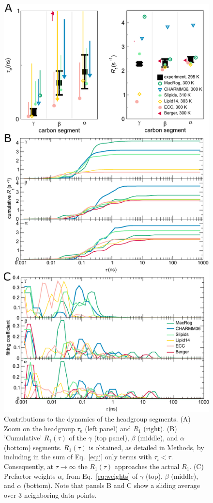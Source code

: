 \documentclass[journal=jcisd8,manuscript=article,layout=twocolumn]{achemso}
\begin{document}
\begin{figure}[!h]
\centering
\includegraphics[width=\columnwidth]{../Figs/cumulativeR1.pdf}
\caption{Contributions to the dynamics of the headgroup segments.
(A) Zoom on the headgroup $\tau_\mathrm e$ (left panel) and $R_1$ (right).
(B) 'Cumulative' $R_1(\tau)$ of the
$\gamma$ (top panel), $\beta$ (middle), and $\alpha$ (bottom) segments.
$R_1(\tau)$ is obtained, as detailed in Methods,
by including in the sum of Eq.~\eqref{eq:j} only terms with $\tau_i<\tau$.
Consequently, at $\tau\to\infty$ the $R_1(\tau)$ approaches the actual $R_1$.
(C) Prefactor weights $\alpha_i$ from Eq.~\eqref{eq:weights} of $\gamma$ (top), $\beta$ (middle), and $\alpha$ (bottom).
Note that panels B and C show a sliding average over 3 neighboring data points.
}
\label{fig:cumulativeR1s}
\end{figure}
\end{document}
